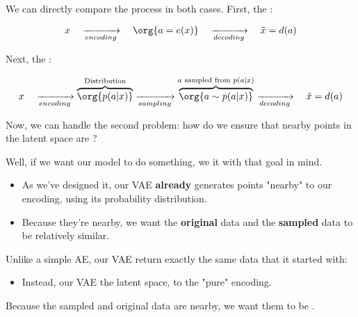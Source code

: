             We can directly compare the process in both cases. First, the :

            \begin{equation}
                x  \quad \xrightarrow[encoding]{} \quad
                \org{a=e(x)} \quad \xrightarrow[decoding]{} \quad
                \tilde{x} = d(a)
            \end{equation}

            Next, the :

            \begin{equation*}
                x  \quad \xrightarrow[encoding]{}
                \overbrace{ \org{p(a|x)} }^{\text{Distribution}}
                \xrightarrow[sampling]{}
                \overbrace{ \org{a \sim p(a|x)} }^{\text{$a$ sampled from $p(a|x)$}}
                \xrightarrow[decoding]{} \quad
                \tilde{x} = d(a)
            \end{equation*}

            \subsecdiv

            Now, we can handle the second problem: how do we ensure that nearby points in the latent space are ?

            Well, if we want our model to do something, we  it with that goal in mind.

            \begin{itemize}
                \item As we've designed it, our VAE \textbf{already} generates points "nearby" to our encoding, using its probability distribution.

                \item Because they're nearby, we want the \textbf{original} data and the \textbf{sampled} data to be relatively similar.\\
            \end{itemize}

            \begin{concept}
                Unlike a simple AE, our VAE  return exactly the same data that it started with: 

                \begin{itemize}
                    \item Instead, our VAE  the latent space,  to the "pure" encoding.
                \end{itemize}

                Because the sampled and original data are nearby, we want them to be .
            \end{concept}
            

